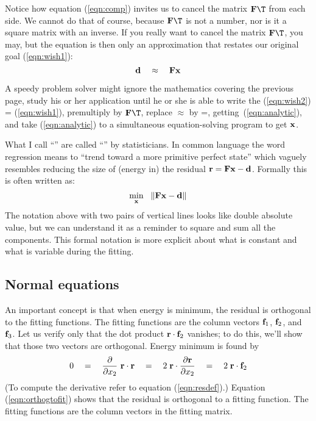 \par
Notice how equation
(\ref{eqn:comp})
invites us to cancel the matrix
$\bold F\T$
from each side.
We cannot do that of course, because
$\bold F\T$
is not a number, nor is it a square matrix with an inverse.
If you really want to cancel the matrix $\bold F\T$, you may,
but the equation is then only an approximation
that restates our original goal (\ref{eqn:wish1}):
\begin{equation}
{\bf d}  \quad \approx \quad \bold F   \bold x 
\label{eqn:wish2}
\end{equation}

\par
A speedy problem solver might
ignore the mathematics covering the previous page,
study his or her application until he or she
is able to write the 
(\ref{eqn:wish2}) = (\ref{eqn:wish1}),
premultiply by $\bold F\T$,
replace $\approx$ by =,
getting~(\ref{eqn:analytic}),
and take
(\ref{eqn:analytic})
to a simultaneous equation-solving program to get $\bold x$.

\par
What I call ``'' are called
``'' by statisticians.
In common language the word regression means
to ``trend toward a more primitive perfect state''
which vaguely resembles reducing the size of (energy in)
the residual $\bold r = \bold F \bold x - \bold d $.
Formally this is often written as:
\begin{equation}
\min_{\bold x} \ \  \| \bold F \bold x - \bold d \| 
\label{eqn:norm}
\end{equation}
The notation above with two pairs of vertical lines
looks like double absolute value,
but we can understand it as a reminder to square and sum all the components.
This formal notation is more explicit
about what is constant and what is variable during the fitting.

\subsection{Normal equations}
\par

An important concept is that when energy is minimum,
the residual is orthogonal to the fitting functions.
The fitting functions are the column vectors
$\bold f_1$, $\bold f_2$, and $\bold f_3$.
Let us verify only that the dot product $ \bold r \cdot \bold f_2 $ vanishes;
to do this, we'll show
that those two vectors are orthogonal.
Energy minimum is found by
\begin{equation}
0  \quad = \quad {\partial\over \partial x_2}\ \bold r \cdot \bold r
   \quad = \quad 2\; \bold r \cdot {\partial \bold r\over \partial x_2}
   \quad = \quad 2\; \bold r \cdot \bold f_2
\label{eqn:orthogtofit}
\end{equation}
(To compute the derivative refer to equation (\ref{eqn:resdef}).)
Equation (\ref{eqn:orthogtofit}) shows that
the residual is orthogonal to a fitting function.
The fitting functions are the column vectors in the fitting matrix.

